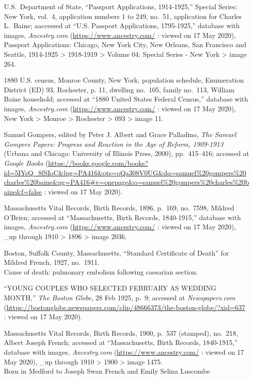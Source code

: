 \begin{thebibliography}{999}
	U.S.\ Department of State, ``Passport Applications, 1914-1925,'' Special Series: New York, vol.\ 4, application numbers 1 to 249, no.\ 51, application for Charles L.\ Baine; aaccessed at ``U.S. Passport Applications, 1795-1925,'' database with images, \textit{Ancestry.com} (\url{https://www.ancestry.com/} : viewed on 17 May 2020), Passport Applications: Chicago, New York City, New Orleans, San Francisco and Seattle, 1914-1925 > 1918-1919 > Volume 04: Special Series - New York > image 264.
	
	1880 U.S. census, Monroe County, New York, population schedule, Enumeration District (ED) 93, Rochester, p. 11, dwelling no.\ 105, family no.\ 113, William Baine household; accessed at ``1880 United States Federal Census,'' database with images, \textit{Ancestry.com} (\url{https://www.ancestry.com/} : viewed on 17 May 2020), New York > Monroe > Rochester > 093 > image 11.
	
	Samuel Gompers, edited by Peter J. Albert and Grace Palladino, \textit{The Samuel Gompers Papers: Progress and Reaction in the Age of Reform, 1909-1913} (Urbana and Chicago: University of Illinois Press, 2000), pp.\ 415--416; accessed at \textit{Google Books} (\url{https://books.google.com/books?id=5IYsQ\_8fSIoC\&lpg=PA416\&ots=oQa308V0UG\&dq=samuel\%20gompers\%20charles\%20baine\&pg=PA416#v=onepage\&q=samuel\%20gompers\%20charles\%20baine\&f=false} : viewed on 17 May 2020).
	
	Massachusetts Vital Records, Birth Records, 1896, p.\ 169, no.\ 7598, Mildred O'Brien; accessed at ``Massachusetts, Birth Records, 1840-1915,'' database with images, \textit{Ancestry.com} (\url{https://www.ancestry.com/} : viewed on 17 May 2020), \_up through 1910 > 1896 > image 2036.
	
	Boston, Suffolk County, Massachusetts, ``Standard Certificate of Death'' for Mildred French, 1927, no.\ 1911.\\
	Cause of death: pulmonary embolism following caesarian section.
	
	``YOUNG COUPLES WHO SELECTED FEBRUARY AS WEDDING MONTH,'' \textit{The Boston Globe}, 28 Feb 1925, p.\ 9; accessed at \textit{Newspapers.com} (\url{https://bostonglobe.newspapers.com/clip/48666373/the-boston-globe/?xid=637} : viewed on 17 May 2020).
	
	Massachusetts Vital Records, Birth Records, 1900, p.\ 537 (stamped), no.\ 218, Albert Joseph French; accessed at ``Massachusetts, Birth Records, 1840-1915,'' database with images, \textit{Ancestry.com} (\url{https://www.ancestry.com/} : viewed on 17 May 2020), \_up through 1910 > 1900 > image 1475.\\
	Born in Medford to Joseph Swan French and Emily Selina Luscombe
	

\end{thebibliography}
